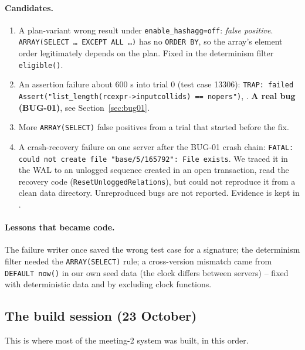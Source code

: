 \paragraph{Candidates.}
\begin{enumerate}
  \item A plan-variant wrong result under \texttt{enable\_hashagg=off}:
    \emph{false positive}. \texttt{ARRAY(SELECT \dots{} EXCEPT ALL \dots)} has no
    \texttt{ORDER BY}, so the array's element order legitimately depends on the
    plan. Fixed in the determinism filter \texttt{eligible()}.
  \item An assertion failure about 600 s into trial 0 (test case 13306):
    \texttt{TRAP: failed Assert("list\_length(rcexpr->inputcollids) == nopers")},
    . \textbf{A real bug (BUG-01)}, see
    Section~\ref{sec:bug01}.
  \item More \texttt{ARRAY(SELECT)} false positives from a trial that started
    before the fix.
  \item A crash-recovery failure on one server after the BUG-01 crash chain:
    \texttt{FATAL: could not create file "base/5/165792": File exists}. We traced
    it in the WAL to an unlogged sequence created in an open transaction, read
    the recovery code (\texttt{ResetUnloggedRelations}), but could not
    reproduce it from a clean data directory. Unreproduced bugs are not
    reported. Evidence is kept in .
\end{enumerate}

\paragraph{Lessons that became code.} The failure writer once saved the wrong
test case for a signature; the determinism filter needed the
\texttt{ARRAY(SELECT)} rule; a cross-version mismatch came from
\texttt{DEFAULT now()} in our own seed data (the clock differs between
servers) -- fixed with deterministic data and by excluding clock functions.

\subsection{The build session (23 October)}

This is where most of the meeting-2 system was built, in this order.

